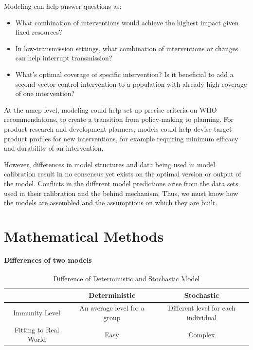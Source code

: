 \documentclass[a4paper, 12pt, twoside]{article}
\begin{document}
Modeling can help answer questions as:

\begin{itemize}
	\item What combination of interventions would achieve the highest impact given fixed resources?
	\item In low-transmission settings, what combination of interventions or changes can help interrupt transmission?
	\item What's optimal coverage of specific intervention? Is it beneficial to add a second vector control intervention to a population with already high coverage of one intervention?
\end{itemize}

At the \gls{nmcp} level, modeling could help set up precise criteria on WHO recommendations, to create a transition from policy-making to planning. For product research and development planners, models could help devise target product profiles for new interventions, for example requiring minimum efficacy and durability of an intervention.

However, differences in model structures and data being used in model calibration result in no consensus yet exists on the optimal version or output of the model.
Conflicts in the different model predictions arise from the data sets used in their calibration and the behind mechanism.
Thus, we must know how the models are assembled and the assumptions on which they are built.

\section{Mathematical Methods}


\paragraph{Differences of two models}%
\label{par:differences_of_two_models}

\begin{table}[ht]
	\centering
	\label{tab:difference}
	\begin{tabular}{c c c}
		\toprule
		                      & Deterministic                & Stochastic                          \\
		\midrule
		Immunity Level        & An average level for a group & Different level for each individual \\
		Fitting to Real World & Easy                         & Complex                             \\
		\bottomrule
	\end{tabular}
	\caption{Difference of Deterministic and Stochastic Model}
\end{table}
\end{document}
